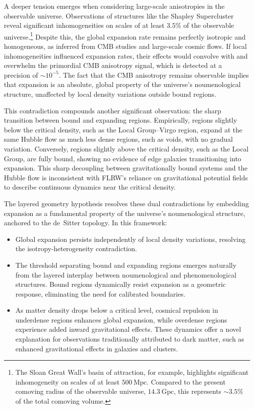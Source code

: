 \documentclass[aps,rmp,groupedaddress,twocolumn,10pt]{revtex4-2}
\begin{document}
A deeper tension emerges when considering large-scale anisotropies in the observable universe. Observations of structures like the Shapley Supercluster \cite{Valade2024} reveal significant inhomogeneities on scales of at least $3.5\%$ of the observable universe.\footnote{The Sloan Great Wall's basin of attraction, for example, highlights significant inhomogeneity on scales of at least $500~\text{Mpc}$. Compared to the present comoving radius of the observable universe, $14.3~\text{Gpc}$, this represents $\sim 3.5\%$ of the total comoving volume.} Despite this, the global expansion rate remains perfectly isotropic and homogeneous, as inferred from CMB studies and large-scale cosmic flows. If local inhomogeneities influenced expansion rates, their effects would convolve with and overwhelm the primordial CMB anisotropy signal, which is detected at a precision of $\sim 10^{-5}$. The fact that the CMB anisotropy remains observable implies that expansion is an absolute, global property of the universe's noumenological structure, unaffected by local density variations outside bound regions.

This contradiction compounds another significant observation: the sharp transition between bound and expanding regions. Empirically, regions slightly below the critical density, such as the Local Group–Virgo region, expand at the same Hubble flow as much less dense regions, such as voids, with no gradual variation. Conversely, regions slightly above the critical density, such as the Local Group, are fully bound, showing no evidence of edge galaxies transitioning into expansion. This sharp decoupling between gravitationally bound systems and the Hubble flow \cite{Paraskevas2024, Wang2023} is inconsistent with FLRW's reliance on gravitational potential fields to describe continuous dynamics near the critical density.

The layered geometry hypothesis resolves these dual contradictions by embedding expansion as a fundamental property of the universe's noumenological structure, anchored to the de~Sitter topology. In this framework:
\begin{itemize}
    \item Global expansion persists independently of local density variations, resolving the isotropy-heterogeneity contradiction.
    \item The threshold separating bound and expanding regions emerges naturally from the layered interplay between noumenological and phenomenological structures. Bound regions dynamically resist expansion as a geometric response, eliminating the need for calibrated boundaries.
    \item As matter density drops below a critical level, cosmical repulsion in underdense regions enhances global expansion, while overdense regions experience added inward gravitational effects. These dynamics offer a novel explanation for observations traditionally attributed to dark matter, such as enhanced gravitational effects in galaxies and clusters.
\end{itemize}
\end{document}
